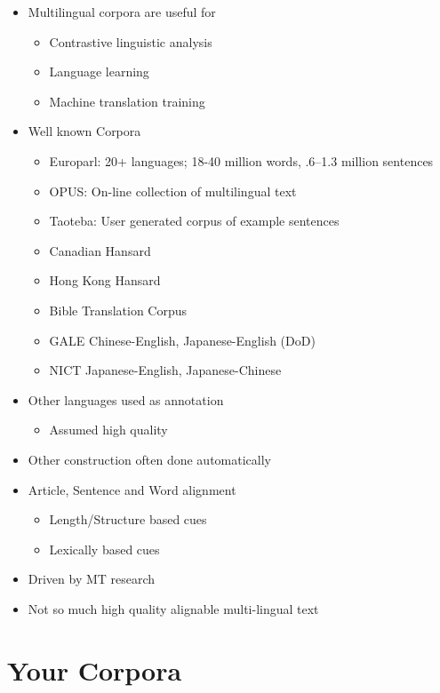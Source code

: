 \documentclass[a4paper,landscape,headrule,footrule,xetex]{foils}
\begin{document}
\begin{itemize}
\item Multilingual corpora are useful for
  \begin{itemize}
  \item Contrastive linguistic analysis
  \item Language learning
  \item Machine translation training
  \end{itemize}
\item Well known Corpora
  \begin{itemize}
  \item Europarl: 20+ languages;  18-40 million words, .6--1.3 million sentences
  \item OPUS:  On-line collection of multilingual text
  \item Taoteba:  User generated corpus of example sentences
  \item Canadian Hansard
  \item Hong Kong Hansard
  \item Bible Translation Corpus
  \item GALE Chinese-English, Japanese-English (DoD)
  \item NICT Japanese-English, Japanese-Chinese
  \end{itemize}
\end{itemize}

\begin{itemize}
\item Other languages used as annotation
  \begin{itemize}
  \item Assumed high quality
  \end{itemize}
\item Other construction often done automatically
\item Article, Sentence and Word alignment
  \begin{itemize}
  \item Length/Structure based cues
  \item Lexically based cues
  \end{itemize}
\item Driven by MT research
\item Not so much high quality alignable multi-lingual text
\end{itemize}

\section{Your Corpora}
\end{document}
